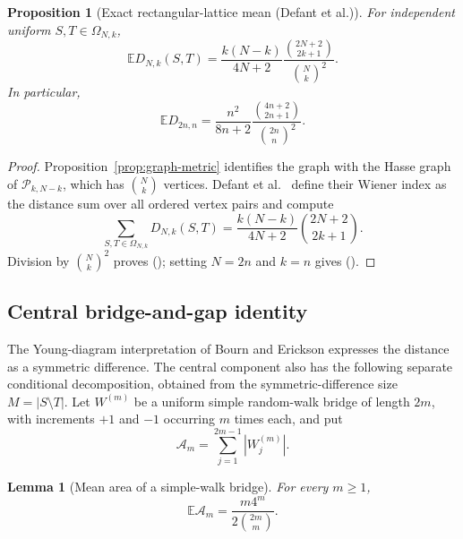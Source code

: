 \documentclass[twoside,10pt]{article}
\numberwithin{equation}{section}
\theoremstyle{slbody}
\newtheorem{proposition}[theorem]{Proposition}
\newtheorem{lemma}[theorem]{Lemma}
\theoremstyle{definition}
\theoremstyle{remark}
\newcommand{\E}{\mathbb{E}}
\newcommand{\1}{\mathbf{1}}
\renewcommand{\eqref}[1]{%
  \textup{{\normalfont(\oldstylenums{\ref{#1}}}\normalfont)}}
\begin{document}
\begin{proposition}[Exact rectangular-lattice mean (Defant et al.)]\label{prop:closed-form}
For independent uniform $S,T\in\Omega_{N,k}$,
\begin{equation}\label{eq:closed-form}
 \E D_{N,k}(S,T)
 =\frac{k(N-k)}{4N+2}
   \frac{\binom{2N+2}{2k+1}}{\binom Nk^2}.
\end{equation}
In particular,
\begin{equation}\label{eq:central-closed-form}
 \E D_{2n,n}
 =\frac{n^2}{8n+2}
   \frac{\binom{4n+2}{2n+1}}{\binom{2n}{n}^2}.
\end{equation}
\end{proposition}

\begin{proof}
Proposition~\ref{prop:graph-metric} identifies the graph with the Hasse graph
of $\mathcal P_{k,N-k}$, which has $\binom Nk$ vertices.  Defant et
al.~\cite[Corollary~3]{DefantEtAl} define their Wiener index as the distance
sum over all ordered vertex pairs and compute
\[
 \sum_{S,T\in\Omega_{N,k}}D_{N,k}(S,T)
 =\frac{k(N-k)}{4N+2}\binom{2N+2}{2k+1}.
\]
Division by $\binom Nk^2$ proves \eqref{eq:closed-form}; setting $N=2n$ and
$k=n$ gives \eqref{eq:central-closed-form}.
\end{proof}

\subsection{Central bridge-and-gap identity}

The Young-diagram interpretation of Bourn and Erickson expresses the distance
as a symmetric difference.  The central component also has the following
separate conditional decomposition, obtained from the symmetric-difference
size $M=|S\setminus T|$.  Let $W^{(m)}$ be a
uniform simple random-walk bridge of length $2m$, with increments $+1$ and
$-1$ occurring $m$ times each, and put
\[
 \mathcal A_m=\sum_{j=1}^{2m-1}|W^{(m)}_j|.
\]

\begin{lemma}[Mean area of a simple-walk bridge]\label{lem:discrete-bridge-area}
For every $m\geq1$,
\begin{equation}\label{eq:discrete-bridge-area}
 \E\mathcal A_m=\frac{m4^m}{2\binom{2m}{m}}.
\end{equation}
\end{lemma}
\end{document}
